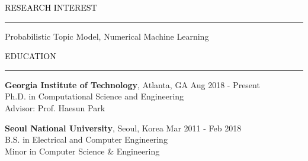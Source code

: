 \documentclass{resume} %
\renewenvironment{rSection}[1]{
	\sectionskip
	\textcolor{Black}{\MakeUppercase{#1}}
	\sectionlineskip
	\hrule
	\begin{list}{}{
			\setlength{\leftmargin}{1.5em}
		}
		\item[]
	}{
	\end{list}
}
\begin{document}
	
	\begin{rSection}{Research Interest}
		Probabilistic Topic Model, Numerical Machine Learning\hfill
		\vspace{-2mm}
	\end{rSection}
	
	
	\vspace*{-2.0mm}
	\begin{rSection}{Education}
		\vspace{-1mm}		
		{\bf Georgia Institute of Technology}, Atlanta, GA \hfill { Aug 2018 - Present} 
		\\ Ph.D. in Computational Science and Engineering  
		\\ Advisor: Prof. Haesun Park\hfill
		
		\vspace*{-2.5mm}
		{\bf Seoul National University}, Seoul, Korea \hfill { Mar 2011 - Feb 2018} 
		\\ B.S. in Electrical and Computer Engineering \hfill
		\\ Minor in Computer Science \& Engineering \hfill
				
	\end{rSection}
\vspace*{-2.5mm}

\end{document}
